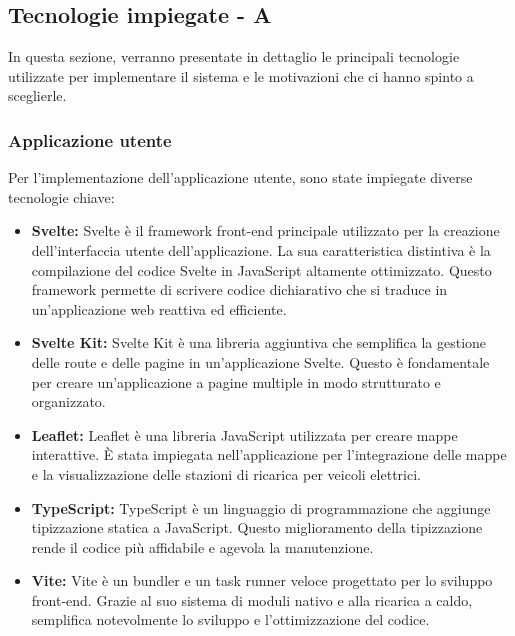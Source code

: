 \subsection{Tecnologie impiegate - A}

In questa sezione, verranno presentate in dettaglio le principali tecnologie utilizzate per implementare il sistema e le motivazioni che ci hanno spinto a sceglierle.

\subsubsection{Applicazione utente}

Per l'implementazione dell'applicazione utente, sono state impiegate diverse tecnologie chiave:

\begin{itemize}
      \item \textbf{Svelte:} Svelte è il framework front-end principale utilizzato per la creazione dell'interfaccia utente dell'applicazione. La sua caratteristica distintiva è la compilazione del codice Svelte in JavaScript altamente ottimizzato. Questo framework permette di scrivere codice dichiarativo che si traduce in un'applicazione web reattiva ed efficiente.

      \item \textbf{Svelte Kit:} Svelte Kit è una libreria aggiuntiva che semplifica la gestione delle route e delle pagine in un'applicazione Svelte. Questo è fondamentale per creare un'applicazione a pagine multiple in modo strutturato e organizzato.

      \item \textbf{Leaflet:} Leaflet è una libreria JavaScript utilizzata per creare mappe interattive. È stata impiegata nell'applicazione per l'integrazione delle mappe e la visualizzazione delle stazioni di ricarica per veicoli elettrici.

      \item \textbf{TypeScript:} TypeScript è un linguaggio di programmazione che aggiunge tipizzazione statica a JavaScript. Questo miglioramento della tipizzazione rende il codice più affidabile e agevola la manutenzione.

      \item \textbf{Vite:} Vite è un bundler e un task runner veloce progettato per lo sviluppo front-end. Grazie al suo sistema di moduli nativo e alla ricarica a caldo, semplifica notevolmente lo sviluppo e l'ottimizzazione del codice.


\end{itemize}
